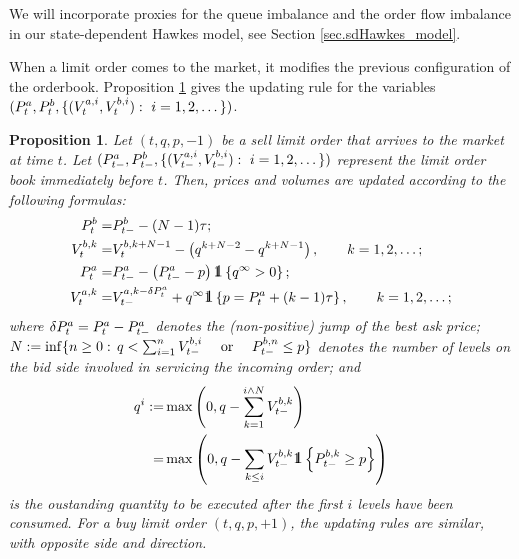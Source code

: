 \documentclass[10pt]{article}
\newtheorem{prop}[thm]{Proposition}
\begin{document}
We will incorporate proxies for the queue imbalance and the order flow imbalance in our state-dependent Hawkes model, see Section \ref{sec.sdHawkes_model}.

When a limit order comes to the market, it modifies the previous configuration of the orderbook. Proposition \ref{prop.lob_update} gives the updating rule for the variables $(\bestAskPrice_t, \bestBidPrice_t, \lbrace (\nthBestAskVolume[i]_t, \nthBestBidVolume[i]_t) : \, \, i=1,2,\dots\rbrace)$.
\begin{prop}\label{prop.lob_update}
 Let $(t,q,p,-1)$ be a sell limit order that arrives to the market at time $t$. Let $(\bestAskPrice_{t-}, \bestBidPrice_{t-},\lbrace  (\nthBestAskVolume[i]_{t-}, \nthBestBidVolume[i]_{t-}) : \, \, i=1,2,\dots\rbrace )$ represent the limit order book immediately before $t$. Then, prices and volumes are updated according to the following formulas:
 \begin{equation}\label{eq.lob_update_sell_order}
  \begin{split}
   \bestBidPrice_t =& \bestBidPrice_{t-} - (N-1)\tickSizeOfLOB;
   \\
   \nthBestBidVolume[k]_{t} 
   =& \nthBestBidVolume[k+N-1]_{t} 
   - \left( q^{k+N-2}-q^{k+N-1}\right), \qquad k=1,2,\dots ; 
   \\
   \bestAskPrice_t = & \bestAskPrice_{t-} 
   - \left(\bestAskPrice_{t-} - p\right) \one\left\lbrace q^{\infty} > 0\right\rbrace ; 
   \\
   \nthBestAskVolume[k]_t = &  \nthBestAskVolume[k-\delta\bestAskPrice_t]_{t-}
   +q^{\infty}\one\left\lbrace p=\bestAskPrice_t + (k-1)\tickSizeOfLOB \right\rbrace, \qquad k=1,2,\dots ;
  \end{split}
 \end{equation}
 where $\delta\bestAskPrice_t = \bestAskPrice_t - \bestAskPrice_{t-}$ denotes the (non-positive) jump of the best ask price;  $N := \inf\lbrace n\geq 0 : \, q<\sum_{i=1}^{n} \nthBestBidVolume[i]_{t-} \quad \text{ or } \quad  \nthBestBidPrice[n]_{t-}\leq p \rbrace$ denotes the number of levels on the bid side involved in servicing the incoming order; and 
 \begin{equation*}
  \begin{split}
   q^{i}:=& \max\left( 0, 
   q-\sum_{k=1}^{i\wedge N} \nthBestBidVolume[k]_{t-}
   \right)
   \\
   =& \max\left( 0, 
   q-\sum_{k\leq i} \nthBestBidVolume[k]_{t-}\one\left\lbrace \nthBestBidPrice[k]_{t-} \geq p\right\rbrace
   \right)
  \end{split}
 \end{equation*}
 is the oustanding quantity to be executed after the first $i$ levels have been consumed. 
 For a buy limit order  $(t,q,p,+1)$, the updating rules are similar, with opposite side and direction. 
\end{prop}
\end{document}
